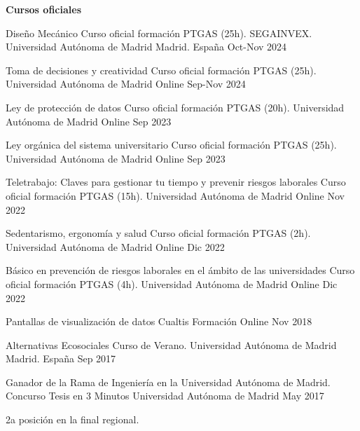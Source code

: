 \textbf{Cursos oficiales}
\begin{cvhonors}
  \cvhonor
	{Diseño Mecánico} %
	{Curso oficial formación PTGAS (25h). SEGAINVEX. Universidad Autónoma de Madrid} %
	{Madrid. España} %
	{Oct-Nov 2024} %
    
   \cvhonor
	{Toma de decisiones y creatividad} %
	{Curso oficial formación PTGAS (25h). Universidad Autónoma de Madrid} %
	{Online} %
	{Sep-Nov 2024} %
	
   \cvhonor
	{Ley de protección de datos} %
	{Curso oficial formación PTGAS (20h). Universidad Autónoma de Madrid} %
	{Online} %
	{Sep 2023} %
	
   \cvhonor
	{Ley orgánica del sistema universitario} %
	{Curso oficial formación PTGAS (25h). Universidad Autónoma de Madrid} %
	{Online} %
	{Sep 2023} %

   \cvhonor
	{Teletrabajo: Claves para gestionar tu tiempo y prevenir riesgos laborales} %
	{Curso oficial formación PTGAS (15h). Universidad Autónoma de Madrid} %
	{Online} %
	{Nov 2022} %
	
   \cvhonor
	{Sedentarismo, ergonomía y salud} %
	{Curso oficial formación PTGAS (2h). Universidad Autónoma de Madrid} %
	{Online} %
	{Dic 2022} %

   \cvhonor
	{Básico en prevención de riesgos laborales en el ámbito de las universidades} %
	{Curso oficial formación PTGAS (4h). Universidad Autónoma de Madrid} %
	{Online} %
	{Dic 2022} %
	
   \cvhonor
	{Pantallas de visualización de datos} %
	{Cualtis Formación}
	{Online} %
	{Nov 2018} %

   \cvhonor
	{Alternativas Ecosociales} %
	{Curso de Verano. Universidad Autónoma de Madrid}
	{Madrid. España} %
	{Sep 2017} %
\end{cvhonors}

\begin{cventries}
  \cventry
    {Ganador de la Rama de Ingeniería en la Universidad Autónoma de Madrid.} %
    {Concurso Tesis en 3 Minutos} %
    {Universidad Autónoma de Madrid} %
    {May 2017} %
    {
      \begin{cvitems} %
        \item {2a posición en la final regional.}
      \end{cvitems}
    }
\end{cventries}